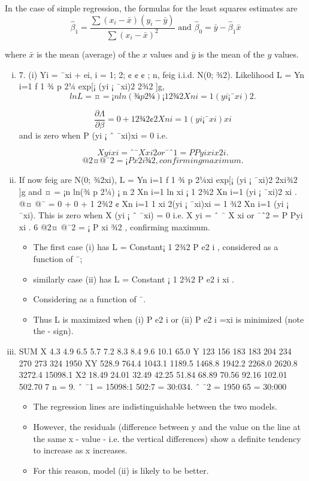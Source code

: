 \documentclass[a4paper,12pt]{article}
\begin{document}
\begin{framed}
In the case of simple regression, the formulas for the least squares estimates are 
\[{\displaystyle {\widehat {\beta }}_{1}={\frac {\sum (x_{i}-{\bar {x}})(y_{i}-{\bar {y}})}{\sum (x_{i}-{\bar {x}})^{2}}}{\text{ and }}{\widehat {\beta }}_{0}={\bar {y}}-{\widehat {\beta }}_{1}{\bar {x}}} \]

where 
$ {\displaystyle {\bar {x}}} $
 is the mean (average) of the 
$ {\displaystyle x} $
 values and 
${\displaystyle {\bar {y}}}$ 
 is the mean of the 
$ {\displaystyle y} $
 values.

\end{framed}
\begin{enumerate}[(i)]
\item 7. (i) Yi = ¯xi + ei, i = 1; 2; ¢ ¢ ¢ ; n, feig i.i.d. N(0; ¾2).
Likelihood L =
Yn
i=1
f
1
¾
p
2¼
exp[¡
(yi ¡ ¯xi)2
2¾2 ]g,
\[lnL = ¤ = ¡n ln(¾
p
2¼) ¡ 1
2¾2
Xn
i=1
(yi ¡ ¯xi)2.\]

\[
\frac{\partial \Lambda}{\partial \beta}

= 0 +
1
2¾2
¢ 2
Xn
i=1
(yi ¡ ¯xi)xi\] and is zero when
P
(yi ¡ ˆ ¯xi)xi = 0 i.e.

\[X
yixi = ˆ ¯
X
xi
2 or ¯ˆ1 =
P
Pyixi
x2
i
.\]
\[@2¤
@¯2 = ¡
P
x2
i
¾2 , confirming maximum.\]

\item  If now feig are N(0; ¾2xi),
L =
Yn
i=1
f
1
¾
p
2¼xi
exp[¡
(yi ¡ ¯xi)2
2xi¾2 ]g
and ¤ = ¡n ln(¾
p
2¼) ¡ n
2
Xn
i=1
ln xi ¡
1
2¾2
Xn
i=1
(yi ¡ ¯xi)2
xi
.
@¤
@¯
= 0 + 0 +
1
2¾2
¢
Xn
i=1
1
xi
2(yi ¡ ¯xi)xi =
1
¾2
Xn
i=1
(yi ¡ ¯xi).
This is zero when
X
(yi ¡ ˆ ¯xi) = 0 i.e.
X
yi = ˆ ¯
X
xi or ¯ˆ2 =
P
Pyi
xi
.
6
@2¤
@¯2 = ¡
P
xi
¾2 , confirming maximum.
\begin{itemize}
\item The first case (i) has L = Constant¡ 1
2¾2
P
e2
i , considered as a function of ¯;
\item similarly case (ii) has L = Constant ¡ 1
2¾2
P e2
i
xi
. 
\item Considering as a function
of ¯. 
\item Thus L is maximized when (i)
P
e2
i or (ii)
P
e2
i =xi is minimized (note
the - sign).
\end{itemize}
\item 
SUM
X 4.3 4.9 6.5 5.7 7.2 8.3 8.4 9.6 10.1 65.0
Y 123 156 183 183 204 234 270 273 324 1950
XY 528.9 764.4 1043.1 1189.5 1468.8 1942.2 2268.0 2620.8 3272.4 15098.1
X2 18.49 24.01 32.49 42.25 51.84 68.89 70.56 92.16 102.01 502.70
7
n = 9. ˆ ¯1 = 15098:1
502:7 = 30:034. ˆ ¯2 = 1950
65 = 30:000

\begin{itemize}
\item The regression lines are indistinguishable between the two models. 
\item However,
the residuals (difference between y and the value on the line at the same x
- value - i.e. the vertical differences) show a definite tendency to increase as
x increases.
\item For this reason, model (ii) is likely to be better.
\end{itemize}
\end{enumerate}
\end{document}
